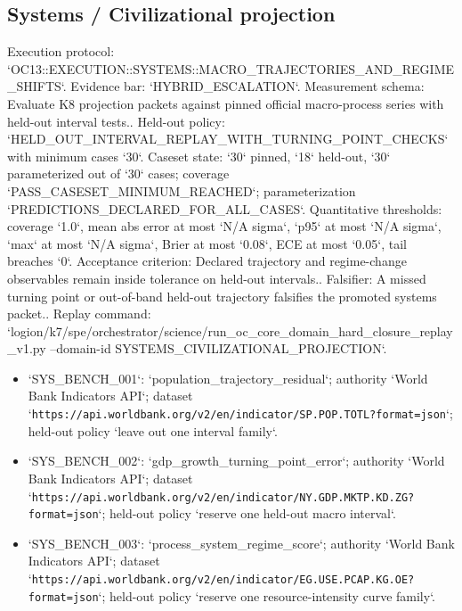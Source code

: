 \subsection{Systems / Civilizational projection}
Execution protocol: `OC13::EXECUTION::SYSTEMS::MACRO\_TRAJECTORIES\_AND\_REGIME\_SHIFTS`. Evidence bar: `HYBRID\_ESCALATION`.
Measurement schema: Evaluate K8 projection packets against pinned official macro-process series with held-out interval tests..
Held-out policy: `HELD\_OUT\_INTERVAL\_REPLAY\_WITH\_TURNING\_POINT\_CHECKS` with minimum cases `30`.
Caseset state: `30` pinned, `18` held-out, `30` parameterized out of `30` cases; coverage `PASS\_CASESET\_MINIMUM\_REACHED`; parameterization `PREDICTIONS\_DECLARED\_FOR\_ALL\_CASES`.
Quantitative thresholds: coverage `1.0`, mean abs error at most `N/A sigma`, `p95` at most `N/A sigma`, `max` at most `N/A sigma`, Brier at most `0.08`, ECE at most `0.05`, tail breaches `0`.
Acceptance criterion: Declared trajectory and regime-change observables remain inside tolerance on held-out intervals..
Falsifier: A missed turning point or out-of-band held-out trajectory falsifies the promoted systems packet..
Replay command: `logion/k7/spe/orchestrator/science/run\_oc\_core\_domain\_hard\_closure\_replay\_v1.py --domain-id SYSTEMS\_CIVILIZATIONAL\_PROJECTION`.
\begin{itemize}
\item `SYS\_BENCH\_001`: `population\_trajectory\_residual`; authority `World Bank Indicators API`; dataset `\texttt{https://api.worldbank.org/v2/en/indicator/SP.POP.TOTL?format=json}`; held-out policy `leave out one interval family`.
\item `SYS\_BENCH\_002`: `gdp\_growth\_turning\_point\_error`; authority `World Bank Indicators API`; dataset `\texttt{https://api.worldbank.org/v2/en/indicator/NY.GDP.MKTP.KD.ZG?format=json}`; held-out policy `reserve one held-out macro interval`.
\item `SYS\_BENCH\_003`: `process\_system\_regime\_score`; authority `World Bank Indicators API`; dataset `\texttt{https://api.worldbank.org/v2/en/indicator/EG.USE.PCAP.KG.OE?format=json}`; held-out policy `reserve one resource-intensity curve family`.
\end{itemize}
